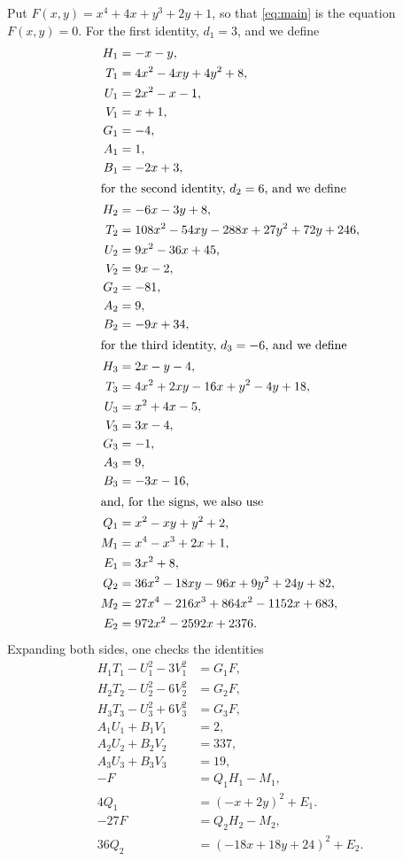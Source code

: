 \documentclass[11pt]{article}
\begin{document}
Put $F(x,y)=x^{4}+4x+y^{3}+2y+1$, so that \eqref{eq:main} is the equation $F(x,y)=0$.
For the first identity, $d_{1}=3$, and we define
\begin{align*}
H_{1}&=-x-y,\\
T_{1}&=4x^{2}-4xy+4y^{2}+8,\\
U_{1}&=2x^{2}-x-1,\\
V_{1}&=x+1,\\
G_{1}&=-4,\\
A_{1}&=1,\\
B_{1}&=-2x+3,\\
\intertext{for the second identity, $d_{2}=6$, and we define}
H_{2}&=-6x-3y+8,\\
T_{2}&=108x^{2}-54xy-288x+27y^{2}+72y+246,\\
U_{2}&=9x^{2}-36x+45,\\
V_{2}&=9x-2,\\
G_{2}&=-81,\\
A_{2}&=9,\\
B_{2}&=-9x+34,\\
\intertext{for the third identity, $d_{3}=-6$, and we define}
H_{3}&=2x-y-4,\\
T_{3}&=4x^{2}+2xy-16x+y^{2}-4y+18,\\
U_{3}&=x^{2}+4x-5,\\
V_{3}&=3x-4,\\
G_{3}&=-1,\\
A_{3}&=9,\\
B_{3}&=-3x-16,\\
\intertext{and, for the signs, we also use}
Q_{1}&=x^{2}-xy+y^{2}+2,\\
M_{1}&=x^{4}-x^{3}+2x+1,\\
E_{1}&=3x^{2}+8,\\
Q_{2}&=36x^{2}-18xy-96x+9y^{2}+24y+82,\\
M_{2}&=27x^{4}-216x^{3}+864x^{2}-1152x+683,\\
E_{2}&=972x^{2}-2592x+2376.
\end{align*}
Expanding both sides, one checks the identities
\begin{align}
H_{1}T_{1}-U_{1}^2-3V_{1}^2&=G_{1}F,\label{eq:norm1}\\
H_{2}T_{2}-U_{2}^2-6V_{2}^2&=G_{2}F,\label{eq:norm2}\\
H_{3}T_{3}-U_{3}^2+6V_{3}^2&=G_{3}F,\label{eq:norm3}\\
A_{1}U_{1}+B_{1}V_{1}&=2,\label{eq:bez1}\\
A_{2}U_{2}+B_{2}V_{2}&=337,\label{eq:bez2}\\
A_{3}U_{3}+B_{3}V_{3}&=19,\label{eq:bez3}\\
-F&=Q_{1}H_{1}-M_{1},\label{eq:sign1}\\
4Q_{1}&=(-x+2y)^2+E_{1}.\label{eq:sign1b}\\
-27F&=Q_{2}H_{2}-M_{2},\label{eq:sign2}\\
36Q_{2}&=(-18x+18y+24)^2+E_{2}.\label{eq:sign2b}
\end{align}
\end{document}
